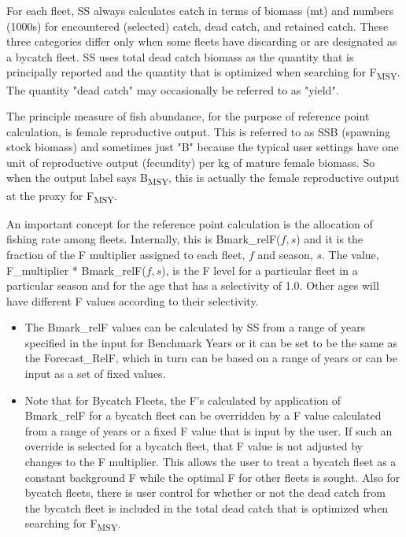 For each fleet, SS always calculates catch in terms of biomass (mt) and numbers (1000s) for encountered (selected) catch, dead catch, and retained catch.  These three categories differ only when some fleets have discarding or are designated as a bycatch fleet.  SS uses total dead catch biomass as the quantity that is principally reported and the quantity that is optimized when searching for F\textsubscript{MSY}.  The quantity "dead catch" may occasionally be referred to as "yield".

The principle measure of fish abundance, for the purpose of reference point calculation, is female reproductive output.  This is referred to as SSB (spawning stock biomass) and sometimes just "B" because the typical user settings have one unit of reproductive output (fecundity) per kg of mature female biomass.  So when the output label says B\textsubscript{MSY}, this is actually the female reproductive output at the proxy for F\textsubscript{MSY}.

An important concept for the reference point calculation is the allocation of fishing rate among fleets.  Internally, this is Bmark\_relF($f,s$) and it is the fraction of the F multiplier assigned to each fleet, $f$ and season, $s$.  The value, F\_multiplier * Bmark\_relF($f,s$), is the F level for a particular fleet in a particular season and for the age that has a selectivity of 1.0.  Other ages will have different F values according to their selectivity.

\begin{itemize}
	\item The Bmark\_relF values can be calculated by SS from a range of years specified in the input for Benchmark Years or it can be set to be the same as the Forecast\_RelF, which in turn can be based on a range of years or can be input as a set of fixed values.
	
	\item Note that for Bycatch Fleets, the F's calculated by application of Bmark\_relF for a bycatch fleet can be overridden by a F value calculated from a range of years or a fixed F value that is input by the user.  If such an override is selected for a bycatch fleet, that F value is not adjusted by changes to the F multiplier.  This allows the user to treat a bycatch fleet as a constant background F while the optimal F for other fleets is sought.  Also for bycatch fleets, there is user control for whether or not the dead catch from the bycatch fleet is included in the total dead catch that is optimized when searching for F\textsubscript{MSY}.
\end{itemize}

